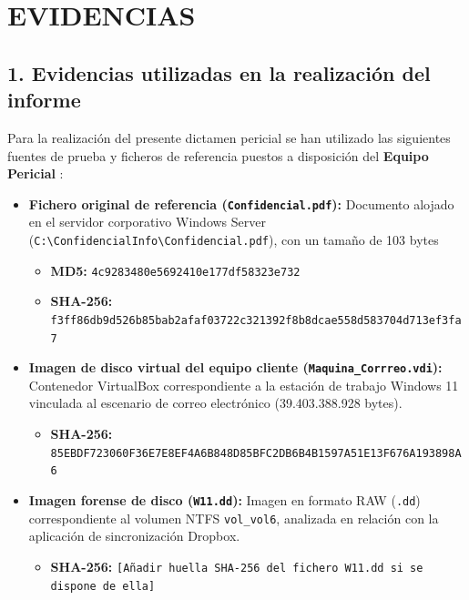 \section*{EVIDENCIAS}
\subsection*{1. Evidencias utilizadas en la realización del informe}

Para la realización del presente dictamen pericial se han utilizado las siguientes fuentes de prueba y ficheros de referencia puestos a disposición del \textbf{Equipo Pericial \GrupoPracticas}:

\begin{itemize}[leftmargin=1.5em, itemsep=0.55em]
	\item \textbf{Fichero original de referencia (\texttt{Confidencial.pdf}):} Documento alojado en el servidor corporativo Windows Server (\texttt{C:\textbackslash ConfidencialInfo\textbackslash Confidencial.pdf}), con un tamaño de 103 bytes
	\begin{itemize}[leftmargin=1.2em]
		\item \textbf{MD5:} \texttt{4c9283480e5692410e177df58323e732}
		\item \textbf{SHA-256:} \texttt{f3ff86db9d526b85bab2afaf03722c321392f8b8dcae558d583704d713ef3fa7}
	\end{itemize}
	
	\item \textbf{Imagen de disco virtual del equipo cliente (\texttt{Maquina\_Corrreo.vdi}):} Contenedor VirtualBox correspondiente a la estación de trabajo Windows 11 vinculada al escenario de correo electrónico (39.403.388.928 bytes).
	\begin{itemize}[leftmargin=1.2em]
		\item \textbf{SHA-256:} \texttt{85EBDF723060F36E7E8EF4A6B848D85BFC2DB6B4B1597A51E13F676A193898A6}
	\end{itemize}
	
	\item \textbf{Imagen forense de disco (\texttt{W11.dd}):} Imagen en formato RAW (\texttt{.dd}) correspondiente al volumen NTFS \texttt{vol\_vol6}, analizada en relación con la aplicación de sincronización Dropbox.
	\begin{itemize}[leftmargin=1.2em]
		\item \textbf{SHA-256:} \texttt{[Añadir huella SHA-256 del fichero W11.dd si se dispone de ella]}
	\end{itemize}
	

\end{itemize}
